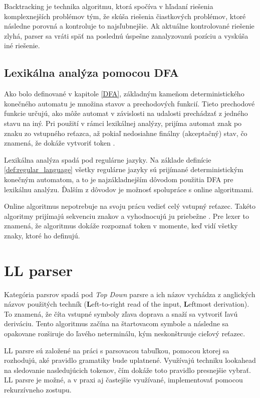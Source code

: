 Backtracking je technika algoritmu, ktorá spočíva v hľadaní riešenia komplexnejších problémov tým, že skúša riešenia čiastkových problémov, ktoré následne porovná a kontroluje to najsľubnejšie. Ak aktuálne kontrolované riešenie zlyhá, parser sa vráti späť na poslednú úspešne zanalyzovanú pozíciu a vyskúša iné riešenie.

\subsection{Lexikálna analýza pomocou DFA}
Ako bolo definované v kapitole \ref{DFA}, základným kameňom deterministického konečného automatu je množina stavov a prechodových funkcií. Tieto prechodové funkcie určujú, ako môže automat v závislosti na udalosti prechádzať z jedného stavu na iný. Pri použití v rámci lexikálnej analýzy, prijíma automat znak po znaku zo vstupného reťazca, až pokiaľ nedosiahne finálny (akceptačný) stav, čo znamená, že dokáže vytvoriť token \cite{roche1997finite}.

Lexikálna analýza spadá pod regulárne jazyky. Na základe definície \ref{def:regular_language} všetky regulárne jazyky sú prijímané deterministickým konečným automatom, a to je najzákladnejším dôvodom použitia DFA pre lexikálnu analýzu. Ďalším z dôvodov je možnosť spolupráce s online algoritmami.

Online algoritmus nepotrebuje na svoju prácu vedieť celý vstupný reťazec. Takéto algoritmy prijímajú sekvenciu znakov a vyhodnocujú ju priebežne \cite{karp1992line}. Pre lexer to znamená, že algoritmus dokáže rozpoznať token v momente, keď vidí všetky znaky, ktoré ho definujú.

\section{LL parser}\label{LL}
Kategória  parsrov spadá pod \textit{Top Down} parsre a ich názov vychádza z anglických názvov použitých techník (\textbf{L}eft-to-right read of the input, \textbf{L}eftmost derivation). To znamená, že číta vstupné symboly zľava doprava a snaží sa vytvoriť ľavú deriváciu. Tento algoritmus začína na štartovacom symbole a následne sa opakovane rozširuje do ľavého neterminálu, kým neskonštruuje cieľový reťazec. 

LL parsre sú založené na práci s parsovacou tabuľkou, pomocou ktorej sa rozhodujú, aké pravidlo gramatiky bude uplatnené. Využívajú techniku lookahead na sledovanie nasledujúcich tokenov, čím dokáže toto pravidlo presnejšie vybrať. LL parsre je možné, a v praxi aj častejšie využívané, implementovať pomocou rekurzívneho zostupu.

